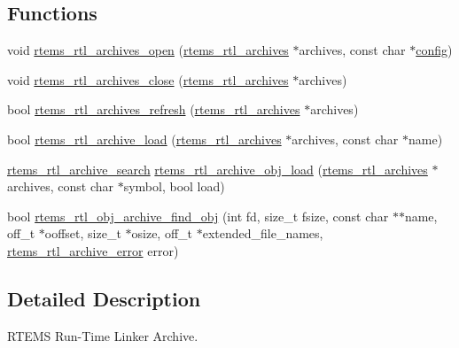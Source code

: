 \subsection*{Functions}
\begin{DoxyCompactItemize}
\item 
void \mbox{\hyperlink{rtl-archive_8c_af74d596594b488ff923e027e9b895d1f}{rtems\+\_\+rtl\+\_\+archives\+\_\+open}} (\mbox{\hyperlink{structrtems__rtl__archives}{rtems\+\_\+rtl\+\_\+archives}} $\ast$archives, const char $\ast$\mbox{\hyperlink{structconfig__s}{config}})
\item 
void \mbox{\hyperlink{rtl-archive_8c_a0c1d8b43e832e9f6c9dd0d583b952384}{rtems\+\_\+rtl\+\_\+archives\+\_\+close}} (\mbox{\hyperlink{structrtems__rtl__archives}{rtems\+\_\+rtl\+\_\+archives}} $\ast$archives)
\item 
bool \mbox{\hyperlink{rtl-archive_8c_ad357ba19c50eb2c554a8ef8bbd1baa74}{rtems\+\_\+rtl\+\_\+archives\+\_\+refresh}} (\mbox{\hyperlink{structrtems__rtl__archives}{rtems\+\_\+rtl\+\_\+archives}} $\ast$archives)
\item 
bool \mbox{\hyperlink{rtl-archive_8c_aec513bfd77432b5004d1a4ed91b7bc3d}{rtems\+\_\+rtl\+\_\+archive\+\_\+load}} (\mbox{\hyperlink{structrtems__rtl__archives}{rtems\+\_\+rtl\+\_\+archives}} $\ast$archives, const char $\ast$name)
\item 
\mbox{\hyperlink{rtl-archive_8h_a82930c14e64f3f5853052e84af4a6c2e}{rtems\+\_\+rtl\+\_\+archive\+\_\+search}} \mbox{\hyperlink{rtl-archive_8c_a48e3be1af298eca62a62e5f1bc72c916}{rtems\+\_\+rtl\+\_\+archive\+\_\+obj\+\_\+load}} (\mbox{\hyperlink{structrtems__rtl__archives}{rtems\+\_\+rtl\+\_\+archives}} $\ast$archives, const char $\ast$symbol, bool load)
\item 
bool \mbox{\hyperlink{rtl-archive_8c_a227474f93062e44724c06cb229de6142}{rtems\+\_\+rtl\+\_\+obj\+\_\+archive\+\_\+find\+\_\+obj}} (int fd, size\+\_\+t fsize, const char $\ast$$\ast$name, off\+\_\+t $\ast$ooffset, size\+\_\+t $\ast$osize, off\+\_\+t $\ast$extended\+\_\+file\+\_\+names, \mbox{\hyperlink{rtl-archive_8h_aeb92821ca23c9daa5393579aa7b9212f}{rtems\+\_\+rtl\+\_\+archive\+\_\+error}} error)
\end{DoxyCompactItemize}


\subsection{Detailed Description}
R\+T\+E\+MS Run-\/\+Time Linker Archive. 



